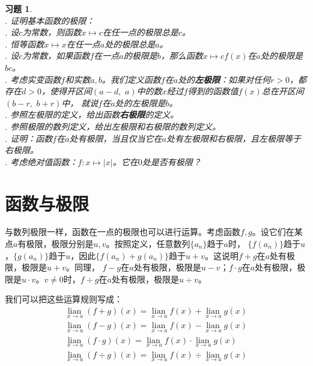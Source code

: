 \documentclass[12pt,UTF8]{ctexbook}
\newcommand{\lian}[1]{
    \underset{#1}{\operatorname{lian}\,}
}
\newtheorem{xt}{习题}[section]
\begin{document}
\begin{xt}
    \mbox{} \\
    . 证明基本函数的极限：\\
    . 设$c$为常数，则函数$x\mapsto c$在任一点的极限总是$c$。\\
    . 恒等函数$x\mapsto x$在任一点$a$处的极限总是$a$。\\
    . 设$c$为常数，如果函数$f$在一点$a$的极限是$b$，那么函数$x\mapsto cf(x)$在$a$处的极限是$bc$。\\
    . 考虑实变函数$f$和实数$a, b$。我们定义函数$f$在$a$处的\textbf{左极限}：如果对任何$r>0$，都存在$d>0$，使得开区间$(a-d,\,\,a)$中的数$x$经过$f$得到的函数值$f(x)$总在开区间$(b-r,\,\,b+r)$中，
    就说$f$在$a$处的左极限是$b$。\\
    . 参照左极限的定义，给出函数\textbf{右极限}的定义。\\
    . 参照极限的数列定义，给出左极限和右极限的数列定义。\\
    . 证明：函数$f$在$a$处有极限，当且仅当它在$a$处有左极限和右极限，且左极限等于右极限。\\
    . 考虑绝对值函数：$f:x\mapsto |x|$。它在$0$处是否有极限？
\end{xt}

\section{函数与极限}
与数列极限一样，函数在一点的极限也可以进行运算。考虑函数$f,g$。设它们在某点$a$有极限，极限分别是$u, v$。按照定义，任意数列$\{a_n\}$趋于$a$时，
$\{f(a_n)\}$趋于$u$，$\{g(a_n)\}$趋于$u$，因此$\{f(a_n) + g(a_n)\}$趋于$u + v$。这说明$f + g$在$a$处有极限，极限是$u + v$。同理，
$f - g$在$a$处有极限，极限是$u - v$；$f \cdot g$在$a$处有极限，极限是$u \cdot v$。$v\neq 0$时，$f\div g$在$a$处有极限，极限是$u \div v$。

我们可以把这些运算规则写成：
\begin{align*}
    \lian{x \to a} (f + g)(x) = \lian{x \to a} f(x) + \lian{x \to a} g(x)  \\
    \lian{x \to a} (f - g)(x) = \lian{x \to a} f(x) - \lian{x \to a} g(x)  \\
    \lian{x \to a} (f \cdot g)(x) = \lian{x \to a} f(x) \cdot \lian{x \to a} g(x)  \\
    \lian{x \to a} (f \div g)(x) = \lian{x \to a} f(x) \div \lian{x \to a} g(x) 
\end{align*}
\end{document}
